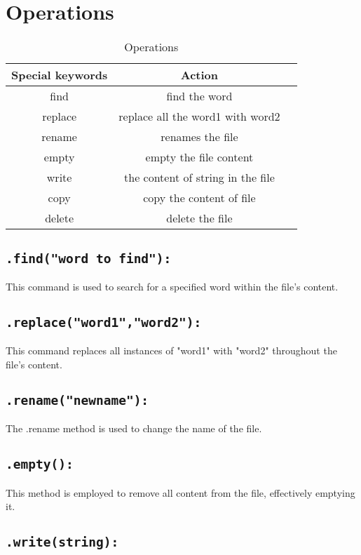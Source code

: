 \documentclass{article}
\begin{document}
\section{Operations}
\begin{table}[h!]
  \centering
  \caption{Operations}
  \label{tab:Operations}
  \begin{tabular}{|c|c|c|}
  \hline
  Special keywords & Action  \\
  \hline
  find & find the word   \\
  replace & replace all the word1 with word2  \\
  rename & renames the file \\
  empty & empty the file content\\
  write & the content of string in the file\\
  copy & copy the content of file \\
  delete & delete the file\\
  \hline
  \end{tabular}
  \end{table}

\subsection{\texttt{.find("word to find"):}}

This command is used to search for a specified word within the file's content.
\subsection{\texttt{.replace("word1","word2"):}}

This command replaces all instances of "word1" with "word2" throughout the file's content.
\subsection{\texttt{.rename("newname"):}}

The .rename method is used to change the name of the file.
\subsection{\texttt{.empty():}}

This method is employed to remove all content from the file, effectively emptying it.
\subsection{\texttt{.write(string):}}
\end{document}

